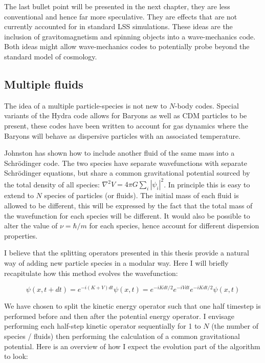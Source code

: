\noindent The last bullet point will be presented in the next chapter, they are less conventional and hence far more speculative. They are effects that are not currently accounted for in standard LSS simulations. These ideas are the inclusion of gravitomagnetism and spinning objects into a wave-mechanics code. Both ideas might allow wave-mechanics codes to potentially probe beyond the standard model of cosmology.


\subsection{Multiple fluids}
The idea of a multiple particle-species is not new to $N$-body codes. Special variants \citep{bib_hmpc1} of the Hydra code \citep{bib_hmpc} allows for Baryons as well as CDM particles to be present, these codes have been written to account for gas dynamics where the Baryons will behave as dispersive particles with an associated temperature.

Johnston has shown how to include another fluid of the same mass into a Schr\"odinger code. The two species have separate wavefunctions with separate Schr\"odinger equations, but share a common gravitational potential sourced by the total density of all species: $\nabla^2 V = 4\pi G \sum_i |\psi_i|^2$. In principle this is easy to extend to $N$ species of particles (or fluids). The initial mass of each fluid is allowed to be different, this will be expressed by the fact that the total mass of the wavefunction for each species will be different. It would also be possible to alter the value of $\nu = \hbar/m$ for each species, hence account for different dispersion properties.

I believe that the splitting operators presented in this thesis provide a natural way of adding new particle species in a modular way. Here I will briefly recapitulate how this method evolves the wavefunction:

\begin{equation}
\psi(x, t+dt) = e^{-i (K+V) dt} \psi(x, t) = e^{-i K dt/2}e^{-i V dt}e^{-i K dt/2} \psi(x, t)
\end{equation}

\noindent We have chosen to split the kinetic energy operator such that one half timestep is performed before and then after the potential energy operator. I envisage performing each half-step kinetic operator sequentially for 1 to $N$ (the number of species / fluids) then performing the calculation of a common gravitational potential. Here is an overview of how I expect the evolution part of the algorithm to look:

